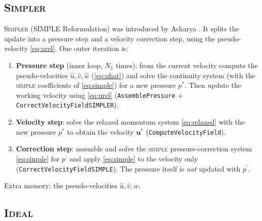 \documentclass[11pt,a4paper]{article}
\newcommand{\vc}[1]{\mathbf{#1}}            %
\begin{document}
\subsection{\textsc{Simpler}}
\label{sec:simpler}

\textsc{Simpler} (SIMPLE Reformulation) was introduced by Acharya
\cite{acharya1991}.  It splits the update into a pressure step and a velocity
correction step, using the pseudo-velocity \eqref{eq:urel}.  One outer
iteration is:
\begin{enumerate}[leftmargin=1.5em]
\item \textbf{Pressure step} (inner loop, $N_{1}$ times): from the current
  velocity compute the pseudo-velocities $\widehat{u},\widehat{v},\widehat{w}$
   (\eqref{eq:uhat}) and solve the continuity system (with the
   \textsc{simple} coefficients of \eqref{eq:simple}) for a new pressure
   $p^{*}$.  Then update
   the working velocity using \eqref{eq:urel}
   (\texttt{AssemblePressure} + \texttt{CorrectVelocityField\allowbreak SIMPLER}).
\item \textbf{Velocity step}: solve the relaxed momentum system
  \eqref{eq:relaxed} with the new pressure $p^{*}$ to obtain the velocity
  $\vc{u}^{*}$ (\texttt{ComputeVelocityField}).
\item \textbf{Correction step}: assemble and solve the \textsc{simple}
  pressure-correction system \eqref{eq:simple} for $p^{\prime}$ and apply
  \eqref{eq:simple} to the velocity only
  (\texttt{CorrectVelocityField\allowbreak SIMPLE}).  The pressure itself is
  \emph{not} updated with $p^{\prime}$.
\end{enumerate}
Extra memory: the pseudo-velocities $\widehat{u},\widehat{v},\widehat{w}$.

\subsection{\textsc{Ideal}}
\label{sec:ideal}
\end{document}
